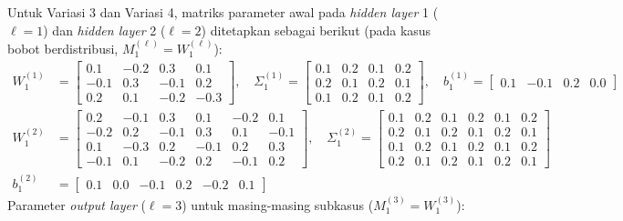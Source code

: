 \documentclass[11pt,a4paper]{article}
\def\mathbf#1{#1}%
\theoremstyle{plain}
\theoremstyle{definition}
\theoremstyle{remark}
\begin{document}
\noindent Untuk Variasi 3 dan Variasi 4, matriks parameter awal pada \textit{hidden layer} 1 ($\ell = 1$) dan \textit{hidden layer} 2 ($\ell = 2$) ditetapkan sebagai berikut (pada kasus bobot berdistribusi, $M^{(\ell)}_1 = W^{(\ell)}_1$):
\begin{align}
    W^{(1)}_1 &= \begin{bmatrix}
         0.1 & -0.2 &  0.3 &  0.1 \\
        -0.1 &  0.3 & -0.1 &  0.2 \\
         0.2 &  0.1 & -0.2 & -0.3
    \end{bmatrix}, \quad
    \Sigma^{(1)}_1 = \begin{bmatrix}
        0.1 & 0.2 & 0.1 & 0.2 \\
        0.2 & 0.1 & 0.2 & 0.1 \\
        0.1 & 0.2 & 0.1 & 0.2
    \end{bmatrix}, \quad
    \mathbf{b}^{(1)}_1 = \begin{bmatrix} 0.1 & -0.1 & 0.2 & 0.0 \end{bmatrix} \label{eq:init_beda_l1} \\[0.3em]
    W^{(2)}_1 &= \begin{bmatrix}
         0.2 & -0.1 &  0.3 &  0.1 & -0.2 &  0.1 \\
        -0.2 &  0.2 & -0.1 &  0.3 &  0.1 & -0.1 \\
         0.1 & -0.3 &  0.2 & -0.1 &  0.2 &  0.3 \\
        -0.1 &  0.1 & -0.2 &  0.2 & -0.1 &  0.2
    \end{bmatrix}, \quad
    \Sigma^{(2)}_1 = \begin{bmatrix}
        0.1 & 0.2 & 0.1 & 0.2 & 0.1 & 0.2 \\
        0.2 & 0.1 & 0.2 & 0.1 & 0.2 & 0.1 \\
        0.1 & 0.2 & 0.1 & 0.2 & 0.1 & 0.2 \\
        0.2 & 0.1 & 0.2 & 0.1 & 0.2 & 0.1
    \end{bmatrix} \label{eq:init_beda_l2_w} \\[0.2em]
    \mathbf{b}^{(2)}_1 &= \begin{bmatrix} 0.1 & 0.0 & -0.1 & 0.2 & -0.2 & 0.1 \end{bmatrix} \label{eq:init_beda_l2_b}
\end{align}
Parameter \textit{output layer} ($\ell = 3$) untuk masing-masing subkasus ($M^{(3)}_1 = W^{(3)}_1$):
\end{document}
